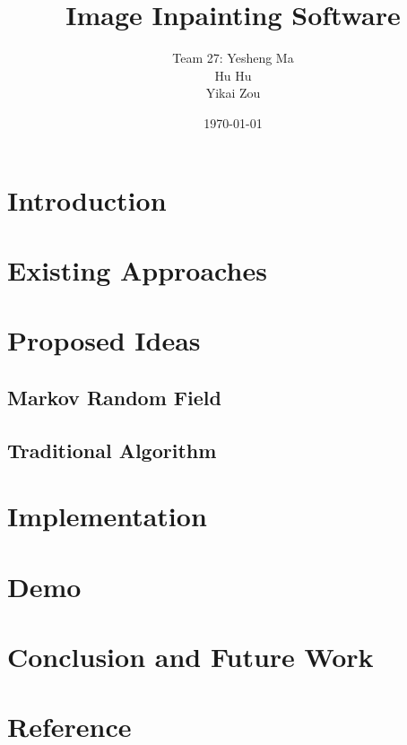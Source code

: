\documentclass{beamer}
\title{Image Inpainting Software}
\author{Team 27: Yesheng Ma\\\hspace{0.9cm}Hu Hu\\\hspace{1.4cm}Yikai Zou}
\institute[SJTU]{}
\date{\today}
\begin{document}
\begin{frame}
\titlepage
\end{frame}



\section{Introduction}


\section{Existing Approaches}


\section{Proposed Ideas}
\subsection{Markov Random Field}

\subsection{Traditional Algorithm}


\section{Implementation}

\section{Demo}

\section{Conclusion and Future Work}

\section*{Reference}


\end{document}
